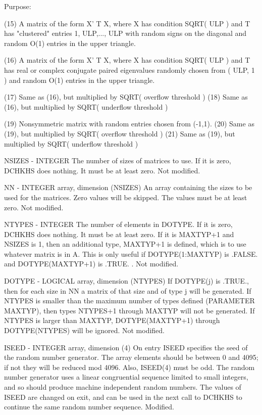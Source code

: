\begin{DoxyParagraph}{Purpose\+: }
\begin{DoxyVerb}
    (15) A matrix of the form  X' T X, where X has condition
         SQRT( ULP ) and T has "clustered" entries 1, ULP,..., ULP
         with random signs on the diagonal and random O(1) entries
         in the upper triangle.

    (16) A matrix of the form  X' T X, where X has condition
         SQRT( ULP ) and T has real or complex conjugate paired
         eigenvalues randomly chosen from ( ULP, 1 ) and random
         O(1) entries in the upper triangle.

    (17) Same as (16), but multiplied by SQRT( overflow threshold )
    (18) Same as (16), but multiplied by SQRT( underflow threshold )

    (19) Nonsymmetric matrix with random entries chosen from (-1,1).
    (20) Same as (19), but multiplied by SQRT( overflow threshold )
    (21) Same as (19), but multiplied by SQRT( underflow threshold )\end{DoxyVerb}
 \begin{DoxyVerb}  NSIZES - INTEGER
           The number of sizes of matrices to use.  If it is zero,
           DCHKHS does nothing.  It must be at least zero.
           Not modified.

  NN     - INTEGER array, dimension (NSIZES)
           An array containing the sizes to be used for the matrices.
           Zero values will be skipped.  The values must be at least
           zero.
           Not modified.

  NTYPES - INTEGER
           The number of elements in DOTYPE.   If it is zero, DCHKHS
           does nothing.  It must be at least zero.  If it is MAXTYP+1
           and NSIZES is 1, then an additional type, MAXTYP+1 is
           defined, which is to use whatever matrix is in A.  This
           is only useful if DOTYPE(1:MAXTYP) is .FALSE. and
           DOTYPE(MAXTYP+1) is .TRUE. .
           Not modified.

  DOTYPE - LOGICAL array, dimension (NTYPES)
           If DOTYPE(j) is .TRUE., then for each size in NN a
           matrix of that size and of type j will be generated.
           If NTYPES is smaller than the maximum number of types
           defined (PARAMETER MAXTYP), then types NTYPES+1 through
           MAXTYP will not be generated.  If NTYPES is larger
           than MAXTYP, DOTYPE(MAXTYP+1) through DOTYPE(NTYPES)
           will be ignored.
           Not modified.

  ISEED  - INTEGER array, dimension (4)
           On entry ISEED specifies the seed of the random number
           generator. The array elements should be between 0 and 4095;
           if not they will be reduced mod 4096.  Also, ISEED(4) must
           be odd.  The random number generator uses a linear
           congruential sequence limited to small integers, and so
           should produce machine independent random numbers. The
           values of ISEED are changed on exit, and can be used in the
           next call to DCHKHS to continue the same random number
           sequence.
           Modified.


\end{DoxyVerb}
\end{DoxyParagraph}
